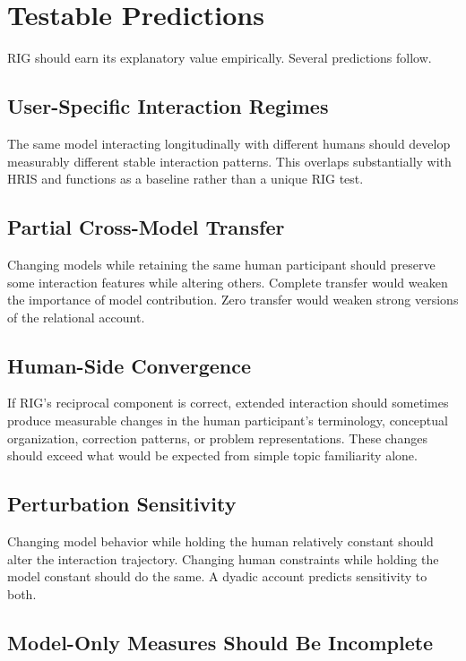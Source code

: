 \documentclass[12pt]{article}
\begin{document}
\section{Testable Predictions}

RIG should earn its explanatory value empirically. Several predictions follow.

\subsection{User-Specific Interaction Regimes}

The same model interacting longitudinally with different humans should develop measurably different stable interaction patterns. This overlaps substantially with HRIS and functions as a baseline rather than a unique RIG test.

\subsection{Partial Cross-Model Transfer}

Changing models while retaining the same human participant should preserve some interaction features while altering others. Complete transfer would weaken the importance of model contribution. Zero transfer would weaken strong versions of the relational account.

\subsection{Human-Side Convergence}

If RIG's reciprocal component is correct, extended interaction should sometimes produce measurable changes in the human participant's terminology, conceptual organization, correction patterns, or problem representations. These changes should exceed what would be expected from simple topic familiarity alone.

\subsection{Perturbation Sensitivity}

Changing model behavior while holding the human relatively constant should alter the interaction trajectory. Changing human constraints while holding the model constant should do the same. A dyadic account predicts sensitivity to both.

\subsection{Model-Only Measures Should Be Incomplete}
\end{document}
